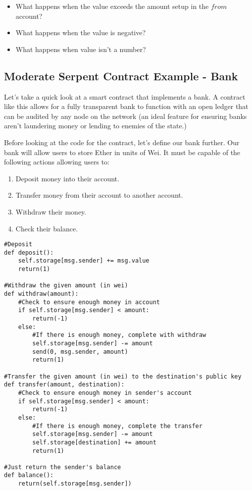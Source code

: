 \documentclass[12pt]{article}
\begin{document}
\begin{itemize}
\item What happens when the value exceeds the amount setup in the $from$ account?
\item What happens when the value is negative?
\item What happens when value isn't a number?
\end{itemize}

\subsection{Moderate Serpent Contract Example - Bank}

Let's take a quick look at a smart contract that implements a bank. A contract like this allows for a fully transparent bank to function with an open ledger that can be audited by any node on the network (an ideal feature for ensuring banks aren't laundering money or lending to enemies of the state.)

Before looking at the code for the contract, let's define our bank further. Our bank will allow users to store Ether in units of Wei. It must be capable of the following actions allowing users to:
\begin{enumerate}
\item Deposit money into their account.
\item Transfer money from their account to another account.
\item Withdraw their money.
\item Check their balance.
\end{enumerate}

\begin{mdframed}
\begin{verbatim}
#Deposit
def deposit():
	self.storage[msg.sender] += msg.value
	return(1)

#Withdraw the given amount (in wei)
def withdraw(amount):
	#Check to ensure enough money in account
	if self.storage[msg.sender] < amount:
		return(-1)
	else:
		#If there is enough money, complete with withdraw
		self.storage[msg.sender] -= amount
		send(0, msg.sender, amount)
		return(1)

#Transfer the given amount (in wei) to the destination's public key
def transfer(amount, destination):
	#Check to ensure enough money in sender's account
	if self.storage[msg.sender] < amount:
		return(-1)
	else:
		#If there is enough money, complete the transfer
		self.storage[msg.sender] -= amount
		self.storage[destination] += amount
		return(1)

#Just return the sender's balance
def balance():
	return(self.storage[msg.sender])
\end{verbatim}
\end{mdframed}
		
\end{document}
